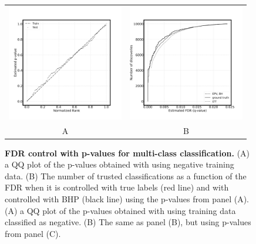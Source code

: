\documentclass{article}
\begin{document}
\begin{figure}
    \centering
	\begin{tabular}{cc}
		\includegraphics[width=2in]{img/cnn_QQ_multi.png} &
		\includegraphics[width=2in]{img/cnn_multi_fdr_control.png} \\	
		A & B \\
	\end{tabular}
	\caption{{\bf FDR control with p-values for multi-class classification.}
		(A) a QQ plot of the p-values obtained with using negative training data. (B) The number of trusted classifications as a function of the FDR when it is controlled with true labels (red line) and with controlled with BHP (black line) using the p-values from panel (A).
		(A) a QQ plot of the p-values obtained with using training data classified as negative. (B) The same as panel (B), but using p-values from panel (C).
	}
	\label{fig:multi}
\end{figure}
\end{document}
